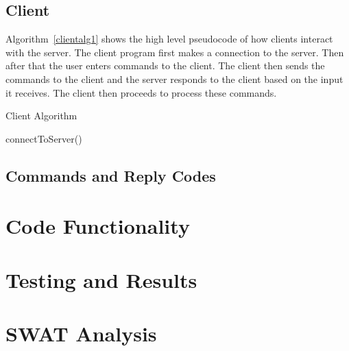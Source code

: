 \documentclass[journal, a4paper]{IEEEtran}
\begin{document}





\subsection{Client}
Algorithm~\ref{clientalg1} shows the high level pseudocode of how clients interact with the server. The client program first makes a connection to the server. Then after that the user enters commands to the client. The client then sends the commands to the client and the server responds to the client based  on the input it receives. The client then proceeds to process these commands. 
\begin{algorithm}
	\caption{Client Algorithm}\label{clientalg1}
	\begin{algorithmic}[1]
		
		connectToServer()
		\EndProcedure
	\end{algorithmic}
\end{algorithm}


\subsection{Commands and Reply Codes}


\section{Code Functionality}



\section{Testing and Results}



\section{SWAT Analysis}
\end{document}
